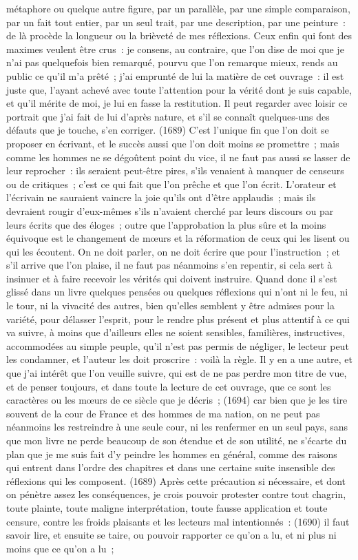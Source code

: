\documentclass[french,twoside]{book} %
\newcommand{\ed}[1]{ {\color{silver}\sffamily\footnotesize (#1)} } %
\begin{document}
métaphore ou quelque autre figure, par un parallèle, par une simple comparaison, par un fait tout entier, par un seul trait, par une description, par une peinture : de là procède la longueur ou la brièveté de mes réflexions. Ceux enfin qui font des maximes veulent être crus : je consens, au contraire, que l’on dise de moi que je n’ai pas quelquefois bien remarqué, pourvu que l’on remarque mieux, rends au public ce qu’il m’a prêté ; j’ai emprunté de lui la matière de cet ouvrage : il est juste que, l’ayant achevé avec toute l’attention pour la vérité dont je suis capable, et qu’il mérite de moi, je lui en fasse la restitution. Il peut regarder avec loisir ce portrait que j’ai fait de lui d’après nature, et s’il se connaît quelques-uns des défauts que je touche, s’en corriger. \ed{1689}C'est l’unique fin que l’on doit se proposer en écrivant, et le succès aussi que l’on doit moins se promettre ; mais comme les hommes ne se dégoûtent point du vice, il ne faut pas aussi se lasser de leur reprocher : ils seraient peut-être pires, s’ils venaient à manquer de censeurs ou de critiques ; c’est ce qui fait que l’on prêche et que l’on écrit. L'orateur et l’écrivain ne sauraient vaincre la joie qu’ils ont d’être applaudis ; mais ils devraient rougir d’eux-mêmes s’ils n’avaient cherché par leurs discours ou par leurs écrits que des éloges ; outre que l’approbation la plus sûre et la moins équivoque est le changement de mœurs et la réformation de ceux qui les lisent ou qui les écoutent. On ne doit parler, on ne doit écrire que pour l’instruction ; et s’il arrive que l’on plaise, il ne faut pas néanmoins s’en repentir, si cela sert à insinuer et à faire recevoir les vérités qui doivent instruire. Quand donc il s’est glissé dans un livre quelques pensées ou quelques réflexions qui n’ont ni le feu, ni le tour, ni la vivacité des autres, bien qu’elles semblent y être admises pour la variété, pour délasser l’esprit, pour le rendre plus présent et plus attentif à ce qui va suivre, à moins que d’ailleurs elles ne soient sensibles, familières, instructives, accommodées au simple peuple, qu’il n’est pas permis de négliger, le lecteur peut les condamner, et l’auteur les doit proscrire : voilà la règle. Il y en a une autre, et que j’ai intérêt que l’on veuille suivre, qui est de ne pas perdre mon titre de vue, et de penser toujours, et dans toute la lecture de cet ouvrage, que ce sont les caractères ou les mœurs de ce siècle que je décris ; \ed{1694}car bien que je les tire souvent de la cour de France et des hommes de ma nation, on ne peut pas néanmoins les restreindre à une seule cour, ni les renfermer en un seul pays, sans que mon livre ne perde beaucoup de son étendue et de son utilité, ne s’écarte du plan que je me suis fait d’y peindre les hommes en général, comme des raisons qui entrent dans l’ordre des chapitres et dans une certaine suite insensible des réflexions qui les composent. \ed{1689}Après cette précaution si nécessaire, et dont on pénètre assez les conséquences, je crois pouvoir protester contre tout chagrin, toute plainte, toute maligne interprétation, toute fausse application et toute censure, contre les froids plaisants et les lecteurs mal intentionnés : \ed{1690}il faut savoir lire, et ensuite se taire, ou pouvoir rapporter ce qu’on a lu, et ni plus ni moins que ce qu’on a lu ; 
\end{document}
